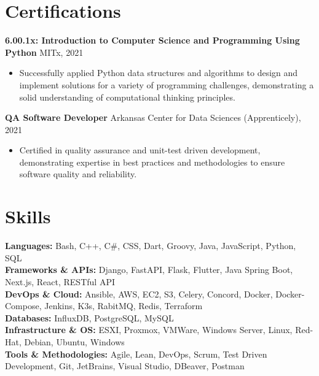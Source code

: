 \documentclass[10pt,a4paper]{article}
\begin{document}
\section{Certifications}
\noindent\textbf{6.00.1x: Introduction to Computer Science and Programming Using Python} \hfill MITx, 2021
\begin{itemize}[leftmargin=*, noitemsep, topsep=0pt]
    \item Successfully applied Python data structures and algorithms to design and implement solutions for a variety of programming challenges, demonstrating a solid understanding of computational thinking principles.
\end{itemize}
\vspace{2mm}

\noindent\textbf{QA Software Developer} \hfill Arkansas Center for Data Sciences (Apprenticely), 2021
\begin{itemize}[leftmargin=*, noitemsep, topsep=0pt]
    \item Certified in quality assurance and unit-test driven development, demonstrating expertise in best practices and methodologies to ensure software quality and reliability.
\end{itemize}

\section{Skills}
    \noindent\textbf{Languages:} Bash, C++, C\#, CSS, Dart, Groovy, Java, JavaScript, Python, SQL \\
    \textbf{Frameworks \& APIs:} Django, FastAPI, Flask, Flutter, Java Spring Boot, Next.js, React, RESTful API \\
    \textbf{DevOps \& Cloud:} Ansible, AWS, EC2, S3, Celery, Concord, Docker, Docker-Compose, Jenkins, K3s, RabitMQ, Redis, Terraform \\
    \textbf{Databases:} InfluxDB, PostgreSQL, MySQL\\
    \textbf{Infrastructure \& OS:} ESXI, Proxmox, VMWare, Windows Server, Linux, Red-Hat, Debian, Ubuntu, Windows  \\
    \textbf{Tools \& Methodologies:} Agile, Lean, DevOps, Scrum, Test Driven Development, Git, JetBrains, Visual Studio, DBeaver, Postman \\
\vspace{2mm}
\end{document}
